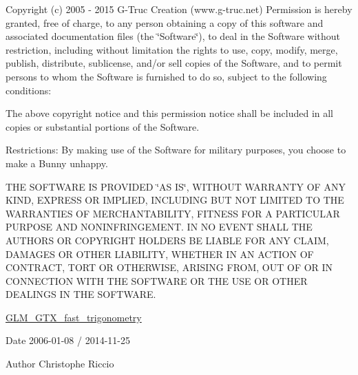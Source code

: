 Copyright (c) 2005 -\/ 2015 G-\/\-Truc Creation (www.\-g-\/truc.\-net) Permission is hereby granted, free of charge, to any person obtaining a copy of this software and associated documentation files (the \char`\"{}\-Software\char`\"{}), to deal in the Software without restriction, including without limitation the rights to use, copy, modify, merge, publish, distribute, sublicense, and/or sell copies of the Software, and to permit persons to whom the Software is furnished to do so, subject to the following conditions\-:

The above copyright notice and this permission notice shall be included in all copies or substantial portions of the Software.

Restrictions\-: By making use of the Software for military purposes, you choose to make a Bunny unhappy.

T\-H\-E S\-O\-F\-T\-W\-A\-R\-E I\-S P\-R\-O\-V\-I\-D\-E\-D \char`\"{}\-A\-S I\-S\char`\"{}, W\-I\-T\-H\-O\-U\-T W\-A\-R\-R\-A\-N\-T\-Y O\-F A\-N\-Y K\-I\-N\-D, E\-X\-P\-R\-E\-S\-S O\-R I\-M\-P\-L\-I\-E\-D, I\-N\-C\-L\-U\-D\-I\-N\-G B\-U\-T N\-O\-T L\-I\-M\-I\-T\-E\-D T\-O T\-H\-E W\-A\-R\-R\-A\-N\-T\-I\-E\-S O\-F M\-E\-R\-C\-H\-A\-N\-T\-A\-B\-I\-L\-I\-T\-Y, F\-I\-T\-N\-E\-S\-S F\-O\-R A P\-A\-R\-T\-I\-C\-U\-L\-A\-R P\-U\-R\-P\-O\-S\-E A\-N\-D N\-O\-N\-I\-N\-F\-R\-I\-N\-G\-E\-M\-E\-N\-T. I\-N N\-O E\-V\-E\-N\-T S\-H\-A\-L\-L T\-H\-E A\-U\-T\-H\-O\-R\-S O\-R C\-O\-P\-Y\-R\-I\-G\-H\-T H\-O\-L\-D\-E\-R\-S B\-E L\-I\-A\-B\-L\-E F\-O\-R A\-N\-Y C\-L\-A\-I\-M, D\-A\-M\-A\-G\-E\-S O\-R O\-T\-H\-E\-R L\-I\-A\-B\-I\-L\-I\-T\-Y, W\-H\-E\-T\-H\-E\-R I\-N A\-N A\-C\-T\-I\-O\-N O\-F C\-O\-N\-T\-R\-A\-C\-T, T\-O\-R\-T O\-R O\-T\-H\-E\-R\-W\-I\-S\-E, A\-R\-I\-S\-I\-N\-G F\-R\-O\-M, O\-U\-T O\-F O\-R I\-N C\-O\-N\-N\-E\-C\-T\-I\-O\-N W\-I\-T\-H T\-H\-E S\-O\-F\-T\-W\-A\-R\-E O\-R T\-H\-E U\-S\-E O\-R O\-T\-H\-E\-R D\-E\-A\-L\-I\-N\-G\-S I\-N T\-H\-E S\-O\-F\-T\-W\-A\-R\-E.

\hyperlink{group__gtx__fast__trigonometry}{G\-L\-M\-\_\-\-G\-T\-X\-\_\-fast\-\_\-trigonometry}

\begin{DoxyDate}{Date}
2006-\/01-\/08 / 2014-\/11-\/25 
\end{DoxyDate}
\begin{DoxyAuthor}{Author}
Christophe Riccio 
\end{DoxyAuthor}
